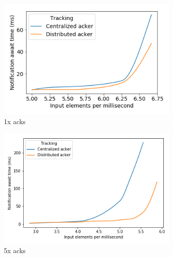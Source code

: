 \begin{figure}[t!]
    \begin{subfigure}[b]{0.32\textwidth}
            \includegraphics[width=0.99\textwidth]{pics/scalability_01x.png}
            \caption{1x acks}
            \label{1x_acks}
    \end{subfigure}
    \hspace{5mm}
    \begin{subfigure}[b]{0.32\textwidth}
            \includegraphics[width=0.99\textwidth]{pics/scalability_05x.png}
            \caption{5x acks}
            \label{5x_acks}
    \end{subfigure}
    \hspace{5mm}
    \begin{subfigure}[b]{0.32\textwidth}

\end{subfigure}
\end{figure}
